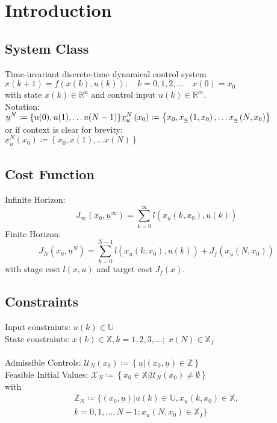\documentclass[english]{latex4ei/latex4ei_sheet}
\begin{document}
\section{Introduction}
\begin{sectionbox}

\subsection{System Class}
Time-invariant discrete-time dynamical control system \\
$x(k+1)=f(x(k), u(k));\quad k=0,1,2,...\quad x(0)=x_0$\\
with state $x(k)\in\mathbb{R}^n$ and control input $u(k)\in\mathbb{R}^m$.\\

Notation:\\
${\underline{u}^{N}\coloneqq\{u(0), u(1), \ldots u(N-1)\}} \\ {\underline{x}_{u}^{N}\left(x_{0}\right)\coloneqq\left\{x_{0}, x_{\underline{u}}\left(1, x_{0}\right), \ldots x_{\underline{u}}\left(N, x_{0}\right)\right\}}$ \\ 
or if context is clear for brevity: \\ ${\underline{x}_{\underline{u}}^{N}\left(x_{0}\right)\coloneqq\left\{x_{0}, x(1), \ldots x(N)\right\}}$

\subsection{Cost Function}
Infinite Horizon:
\[J_{\infty}\left(x_{0}, \underline{u}^{\infty}\right)=\sum_{k=0}^{\infty} l\left(x_{\underline{u}}\left(k, x_{0}\right), u(k)\right)\]
Finite Horizon:
\[J_{N}\left(x_{0}, \underline{u}^{N}\right)=\sum_{k=0}^{N-1} l\left(x_{\underline{u}}\left(k, x_{0}\right), u(k)\right)+J_{f}\left(x_{\underline{u}}\left(N, x_{0}\right)\right)\]
with stage cost $l(x,u)$ and target cost $J_f(x)$.

\subsection{Constraints}
Input constraints: $u(k) \in \mathbb{U}$ \\ 
State constraints: $x(k) \in \mathbb{X}, k=1,2,3, \ldots ;\; x(N) \in \mathbb{X}_{f}$ \\ \\
Admissible Controls:  $\mathcal{U}_{N}\left(x_{0}\right)\coloneqq\left\{\underline{u} |\left(x_{0}, \underline{u}\right) \in \mathbb{Z}\right\}$ \\ Feasible Initial Values: $\mathcal{X}_{N}\coloneqq\left\{x_{0} \in \mathbb{X} | \mathcal{U}_{N}\left(x_{0}\right) \neq \emptyset\right\}$\\
with 
\begin{multline*}
\mathbb{Z}_{N}\coloneqq\Big\{\left(x_{0}, \underline{u}\right) | u(k) \in \mathbb{U}, x_{\underline{u}}\left(k, x_{0}\right) \in \mathbb{X}, \\ k=0,1, \ldots, N-1 ; x_{\underline{u}}\left(N, x_{0}\right) \in \mathbb{X}_{f}\Big\}
\end{multline*}


\end{sectionbox}
\end{document}
